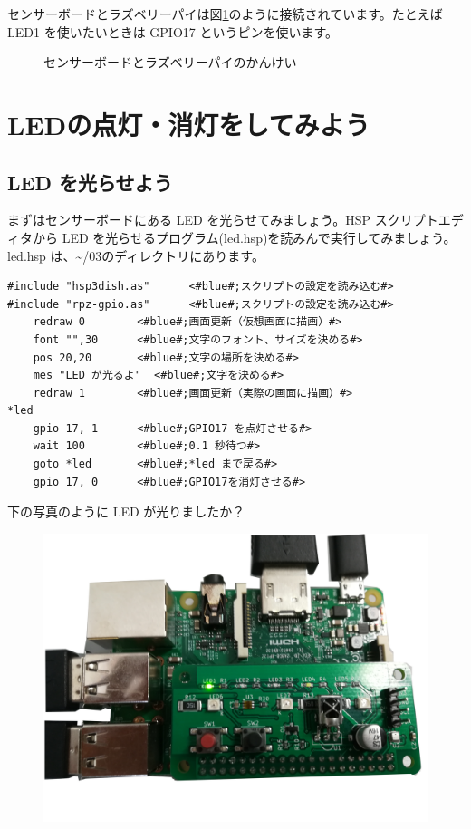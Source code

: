 センサーボードとラズベリーパイは図\ref{sensors}のように接続されています。たとえば LED1 を使いたいときは GPIO17 というピンを使います。

\begin{figure}[H]
    \centering
    
    \caption{センサーボードとラズベリーパイのかんけい}
    \label{sensors}
\end{figure}

\section{LEDの点灯・消灯をしてみよう}
\subsection{LED を光らせよう}

まずはセンサーボードにある LED を光らせてみましょう。HSP スクリプトエディタから LED を光らせるプログラム(led.hsp)を読みんで実行してみましょう。led.hsp は、\textasciitilde /03のディレクトリにあります。\\

\begin{lstlisting}[caption=led.hsp,label=led.hsp]
#include "hsp3dish.as"		<#blue#;スクリプトの設定を読み込む#>
#include "rpz-gpio.as"		<#blue#;スクリプトの設定を読み込む#>
	redraw 0		<#blue#;画面更新（仮想画面に描画）#>
	font "",30		<#blue#;文字のフォント、サイズを決める#>
	pos 20,20		<#blue#;文字の場所を決める#>
	mes "LED が光るよ"	<#blue#;文字を決める#>
	redraw 1		<#blue#;画面更新（実際の画面に描画）#>
*led
	gpio 17, 1		<#blue#;GPIO17 を点灯させる#>
	wait 100		<#blue#;0.1 秒待つ#>
	goto *led		<#blue#;*led まで戻る#>
	gpio 17, 0		<#blue#;GPIO17を消灯させる#>
\end{lstlisting}

下の写真のように LED が光りましたか？\\

\begin{figure}[H]
    \centering
    \includegraphics[width=\linewidth]{images/chap03/text03-img032.jpg}
\end{figure}

